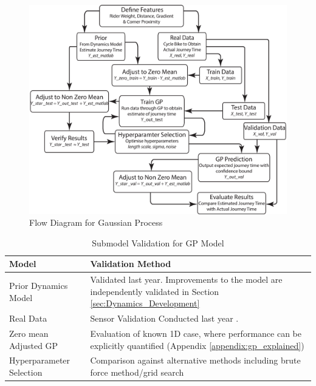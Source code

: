 \documentclass[a4paper, 10pt]{article}
\numberwithin{equation}{section}
\begin{document}
\begin{figure}[h!]
    \centering
    \includegraphics[width=\textwidth]{images/GP_Flow_Diagram.eps}
    \caption{Flow Diagram for Gaussian Process}
    \label{fig:GP_flow}
\end{figure}




\begin{table}[]
\caption{Submodel Validation for GP Model}
\label{tbl:GPsubmodel_validation}
\begin{tabular}{|l|l|} \hline
Model                    & Validation Method                                                                                                             \\ \hline
Prior Dynamics Model     & Validated last year. Improvements to the model are independently validated in Section \ref{sec:Dynamics_Development}             \\
Real Data                & Sensor Validation Conducted last year \cite{report:dynamics}. \\
Zero mean Adjusted GP    & Evaluation of known 1D case, where performance can be explicitly quantified (Appendix \ref{appendix:gp_explained})                                                  \\
Hyperparameter Selection & Comparison against alternative methods including brute force method/grid search \\ \hline                                              
\end{tabular}
\end{table}
\end{document}
